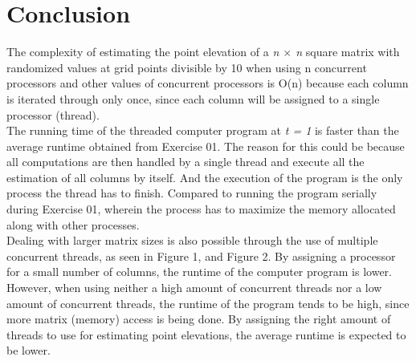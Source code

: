 \documentclass{article}
\begin{document}
\section*{Conclusion}
\hspace{\parindent} The complexity of estimating the point elevation of a \emph{n $\times$ n} square matrix with randomized values at grid points divisible by 10 when using n concurrent processors and other values of concurrent processors is O(n) because each column is iterated through only once, since each column will be assigned to a single processor (thread). \\
\indent The running time of the threaded computer program at \emph{t = 1} is faster than the average runtime obtained from Exercise 01. The reason for this could be because all computations are then handled by a single thread and execute all the estimation of all columns by itself. And the execution of the program is the only process the thread has to finish. Compared to running the program serially during Exercise 01, wherein the process has to maximize the memory allocated along with other processes.\\ 
\indent Dealing with larger matrix sizes is also possible through the use of multiple concurrent threads, as seen in Figure 1, and Figure 2. By assigning a processor for a small number of columns, the runtime of the computer program is lower. However, when using neither a high amount of concurrent threads nor a low amount of concurrent threads, the runtime of the program tends to be high, since more matrix (memory) access is being done. By assigning the right amount of threads to use for estimating point elevations, the average runtime is expected to be lower.\\


\printbibliography{}


\pagebreak
\end{document}
